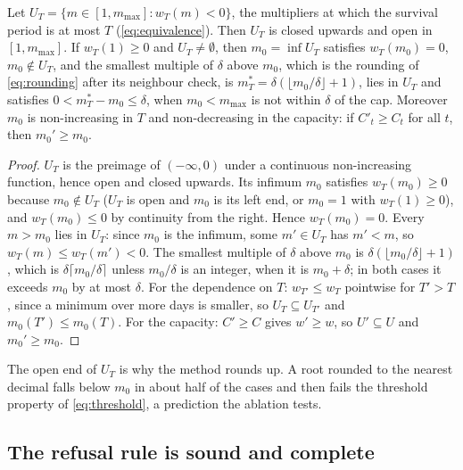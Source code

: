 \begin{proposition}
\label{prop:threshold}
Let $U_T=\{m\in[1,m_{\max}]:w_T(m)<0\}$, the multipliers at which the survival period is at most $T$ (\cref{eq:equivalence}). Then $U_T$ is closed upwards and open in $[1,m_{\max}]$. If $w_T(1)\ge 0$ and $U_T\ne\emptyset$, then $m_0=\inf U_T$ satisfies $w_T(m_0)=0$, $m_0\notin U_T$, and the smallest multiple of $\delta$ above $m_0$, which is the rounding of \cref{eq:rounding} after its neighbour check, is $m^\ast_T=\delta(\lfloor m_0/\delta\rfloor+1)$, lies in $U_T$ and satisfies $0<m^\ast_T-m_0\le\delta$, when $m_0<m_{\max}$ is not within $\delta$ of the cap. Moreover $m_0$ is non-increasing in $T$ and non-decreasing in the capacity: if $C'_t\ge C_t$ for all $t$, then $m_0'\ge m_0$.
\end{proposition}
\begin{proof}
$U_T$ is the preimage of $(-\infty,0)$ under a continuous non-increasing function, hence open and closed upwards. Its infimum $m_0$ satisfies $w_T(m_0)\ge 0$ because $m_0\notin U_T$ ($U_T$ is open and $m_0$ is its left end, or $m_0=1$ with $w_T(1)\ge 0$), and $w_T(m_0)\le 0$ by continuity from the right. Hence $w_T(m_0)=0$. Every $m>m_0$ lies in $U_T$: since $m_0$ is the infimum, some $m'\in U_T$ has $m'<m$, so $w_T(m)\le w_T(m')<0$. The smallest multiple of $\delta$ above $m_0$ is $\delta(\lfloor m_0/\delta\rfloor+1)$, which is $\delta\lceil m_0/\delta\rceil$ unless $m_0/\delta$ is an integer, when it is $m_0+\delta$; in both cases it exceeds $m_0$ by at most $\delta$. For the dependence on $T$: $w_{T'}\le w_T$ pointwise for $T'>T$, since a minimum over more days is smaller, so $U_T\subseteq U_{T'}$ and $m_0(T')\le m_0(T)$. For the capacity: $C'\ge C$ gives $w'\ge w$, so $U'\subseteq U$ and $m_0'\ge m_0$.
\end{proof}

The open end of $U_T$ is why the method rounds up. A root rounded to the nearest decimal falls below $m_0$ in about half of the cases and then fails the threshold property of \cref{eq:threshold}, a prediction the ablation tests.

\subsection{The refusal rule is sound and complete}

